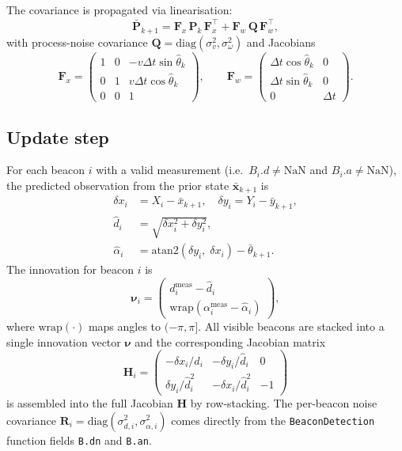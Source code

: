 \documentclass[a4paper,11pt]{report}
\begin{document}
\medskip
The covariance is propagated via linearisation:
\begin{equation}
  \bar{\mathbf{P}}_{k+1} = \mathbf{F}_x\,\hat{\mathbf{P}}_k\,\mathbf{F}_x^\top
                          + \mathbf{F}_w\,\mathbf{Q}\,\mathbf{F}_w^\top,
  \label{eq:pred_cov}
\end{equation}
with process-noise covariance $\mathbf{Q} = \mathrm{diag}(\sigma_v^2, \sigma_\omega^2)$ and Jacobians
\begin{equation}
  \mathbf{F}_x = \begin{pmatrix}
    1 & 0 & -v\Delta t\sin\hat\theta_k \\
    0 & 1 &  v\Delta t\cos\hat\theta_k \\
    0 & 0 & 1
  \end{pmatrix}, \qquad
  \mathbf{F}_w = \begin{pmatrix}
    \Delta t\cos\hat\theta_k & 0 \\
    \Delta t\sin\hat\theta_k & 0 \\
    0 & \Delta t
  \end{pmatrix}.
\end{equation}

\subsection{Update step}

For each beacon $i$ with a valid measurement (i.e.\ $B_i.d \neq \mathrm{NaN}$ and $B_i.a \neq \mathrm{NaN}$), the predicted observation from the prior state $\bar{\bm{x}}_{k+1}$ is
\begin{align}
  \delta x_i &= X_i - \bar{x}_{k+1}, \quad \delta y_i = Y_i - \bar{y}_{k+1}, \\
  \hat{d}_i  &= \sqrt{\delta x_i^2 + \delta y_i^2}, \\
  \hat\alpha_i &= \mathrm{atan2}(\delta y_i,\;\delta x_i) - \bar\theta_{k+1}.
\end{align}
The innovation for beacon $i$ is
\begin{equation}
  \bm{\nu}_i = \begin{pmatrix} d_i^{\mathrm{meas}} - \hat{d}_i \\[2pt]
               \mathrm{wrap}(\alpha_i^{\mathrm{meas}} - \hat\alpha_i) \end{pmatrix},
\end{equation}
where $\mathrm{wrap}(\cdot)$ maps angles to $(-\pi,\pi]$.  All visible beacons are stacked into a single innovation vector $\bm{\nu}$ and the corresponding Jacobian matrix
\begin{equation}
  \mathbf{H}_i = \begin{pmatrix}
    -\delta x_i / \hat{d}_i & -\delta y_i / \hat{d}_i & 0 \\[2pt]
     \delta y_i / \hat{d}_i^2 & -\delta x_i / \hat{d}_i^2 & -1
  \end{pmatrix}
\end{equation}
is assembled into the full Jacobian $\mathbf{H}$ by row-stacking.  The per-beacon noise covariance $\mathbf{R}_i = \mathrm{diag}(\sigma_{d,i}^2, \sigma_{\alpha,i}^2)$ comes directly from the \texttt{BeaconDetection} function fields \texttt{B.dn} and \texttt{B.an}.
\end{document}
